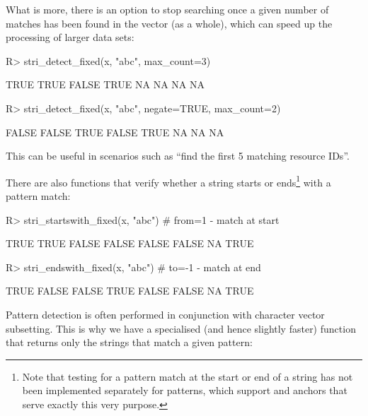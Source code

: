 \documentclass[nojss]{jss}\usepackage[]{graphicx}\usepackage[]{color}
\begin{document}
What is more, there is an option to stop searching
once a given number of matches has been found
in the  vector (as a whole),
which can speed up the processing of larger data sets:

\begin{Schunk}
\begin{Sinput}
R> stri_detect_fixed(x, "abc", max_count=3)
\end{Sinput}
\begin{Soutput}
[1]  TRUE  TRUE FALSE  TRUE    NA    NA    NA    NA
\end{Soutput}
\begin{Sinput}
R> stri_detect_fixed(x, "abc", negate=TRUE, max_count=2)
\end{Sinput}
\begin{Soutput}
[1] FALSE FALSE  TRUE FALSE  TRUE    NA    NA    NA
\end{Soutput}
\end{Schunk}

\noindent
This can be useful in scenarios such as ``find the first 5 matching
resource IDs''.


\medskip
There are also functions that verify whether a string
starts or ends\footnote{Note that testing for a pattern match at the start
or end of a string has not been implemented separately for  patterns,
which support  and  anchors that  serve exactly this very purpose.}
with a pattern match:

\begin{Schunk}
\begin{Sinput}
R> stri_startswith_fixed(x, "abc")  # from=1 - match at start
\end{Sinput}
\begin{Soutput}
[1]  TRUE  TRUE FALSE FALSE FALSE FALSE    NA  TRUE
\end{Soutput}
\begin{Sinput}
R> stri_endswith_fixed(x, "abc")    # to=-1 - match at end
\end{Sinput}
\begin{Soutput}
[1]  TRUE FALSE FALSE  TRUE FALSE FALSE    NA  TRUE
\end{Soutput}
\end{Schunk}


\medskip
Pattern detection is often performed in conjunction
with character vector subsetting.
This is why we have a specialised (and hence slightly faster)
function that  returns only the strings that match a given pattern:
\end{document}
